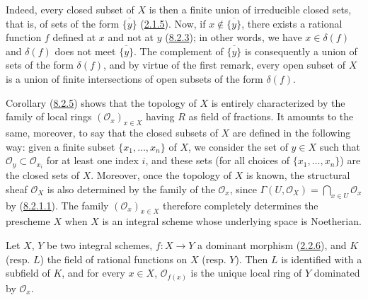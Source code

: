 Indeed, every closed subset of $X$ is then a finite union of irreducible
closed sets, that is, of sets of the form $\overline{\{y\}}$
(\hyperref[I.2.1.5]{2.1.5}). Now, if
$x\notin\overline{\{y\}}$, there exists a rational function $f$ defined at
$x$ and not at $y$ (\hyperref[I.8.2.3]{8.2.3}); in other words, we have
$x\in\delta(f)$ and $\delta(f)$ does not meet $\overline{\{y\}}$. The
complement of $\overline{\{y\}}$ is consequently a union of sets of the
form $\delta(f)$, and by virtue of the first remark, every open subset of $X$
is a union of finite intersections of open subsets of the form $\delta(f)$.

\begin{env}[8.2.6]
\label{I.8.2.6}
Corollary (\hyperref[I.8.2.5]{8.2.5}) shows that the topology of $X$ is
entirely characterized by the family of local rings
$(\mathscr{O}_x)_{x\in X}$ having $R$ as field of fractions. It amounts to
the same, moreover, to say that the closed subsets of $X$ are defined in the
following way: given a finite subset
$\{x_1,\ldots,x_n\}$ of $X$, we consider the set of $y\in X$ such that
$\mathscr{O}_y\subset\mathscr{O}_{x_i}$ for at least one index $i$, and these
sets (for all choices of $\{x_1,\ldots,x_n\}$) are the closed sets of $X$.
Moreover, once the topology of $X$ is known, the structural sheaf
$\mathscr{O}_X$ is also determined by the family of the
$\mathscr{O}_x$, since
$\Gamma(U,\mathscr{O}_X)=\bigcap_{x\in U}\mathscr{O}_x$
by (\hyperref[I.8.2.1.1]{8.2.1.1}). The family
$(\mathscr{O}_x)_{x\in X}$ therefore completely determines the prescheme $X$
when $X$ is an integral scheme whose underlying space is Noetherian.
\end{env}

\begin{proposition}[8.2.7]
\label{I.8.2.7}
Let $X$, $Y$ be two integral schemes, $f:X\to Y$ a dominant morphism
\textup{(\hyperref[I.2.2.6]{2.2.6})}, and $K$ \textup{(resp. $L$)} the field of rational
functions on $X$ \textup{(resp. $Y$)}. Then $L$ is identified with a subfield of
$K$, and for every $x\in X$, $\mathscr{O}_{f(x)}$ is the unique local ring of
$Y$ dominated by $\mathscr{O}_x$.
\end{proposition}

